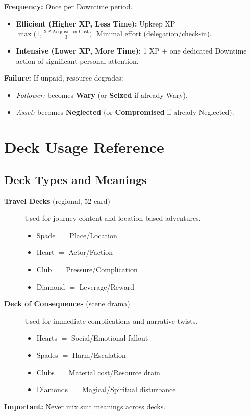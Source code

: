 \textbf{Frequency:} Once per Downtime period.

\begin{itemize}
    \item \textbf{Efficient (Higher XP, Less Time):} Upkeep XP = \(\max\bigl(1, \frac{\text{XP Acquisition Cost}}{3}\bigr)\). Minimal effort (delegation/check‑in).
    \item \textbf{Intensive (Lower XP, More Time):} 1 XP + one dedicated Downtime action of significant personal attention.
\end{itemize}

\textbf{Failure:} If unpaid, resource degrades:
\begin{itemize}
    \item \emph{Follower:} becomes \textbf{Wary} (or \textbf{Seized} if already Wary).
    \item \emph{Asset:} becomes \textbf{Neglected} (or \textbf{Compromised} if already Neglected).
\end{itemize}

\newpage
\section{Deck Usage Reference}\label{sec:deck_reference}

\subsection{Deck Types and Meanings}\label{subsec:deck_types}
\begin{description}
    \item[\textbf{Travel Decks} (regional, 52‑card)] Used for journey content and location‑based adventures.
        \begin{itemize}
            \item Spade $=$ Place/Location
            \item Heart $=$ Actor/Faction
            \item Club $=$ Pressure/Complication
            \item Diamond $=$ Leverage/Reward
        \end{itemize}
    \item[\textbf{Deck of Consequences} (scene drama)] Used for immediate complications and narrative twists.
        \begin{itemize}
            \item Hearts $=$ Social/Emotional fallout
            \item Spades $=$ Harm/Escalation
            \item Clubs $=$ Material cost/Resource drain
            \item Diamonds $=$ Magical/Spiritual disturbance
        \end{itemize}
\end{description}
\textbf{Important:} Never mix suit meanings across decks.

